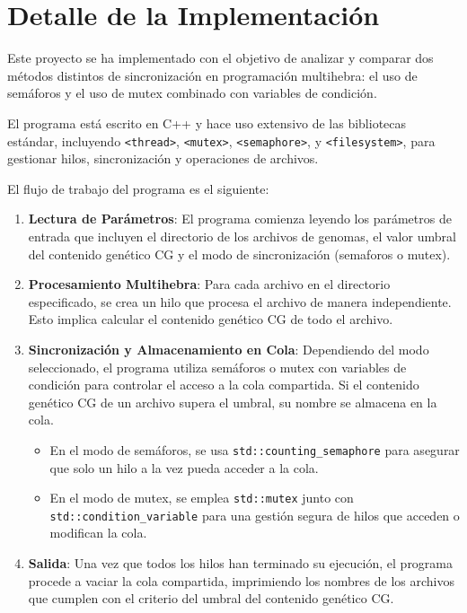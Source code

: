 \documentclass[
	spanish, %
	oneside
]{article}
\begin{document}
\templateFinalcfg


\section*{Detalle de la Implementación}

\noindent Este proyecto se ha implementado con el objetivo de analizar y comparar dos métodos distintos de sincronización en programación multihebra:
 el uso de semáforos y el uso de mutex combinado con variables de condición. 
\vspace*{12pt}

\noindent El programa está escrito en C++ y hace uso extensivo de las bibliotecas estándar, incluyendo \texttt{<thread>}, \texttt{<mutex>}, \texttt{<semaphore>}, y \texttt{<filesystem>}, para gestionar hilos, sincronización y operaciones de archivos.

\vspace*{8pt}
\noindent El flujo de trabajo del programa es el siguiente:
\begin{enumerate}
    \item \textbf{Lectura de Parámetros}: El programa comienza leyendo los parámetros de entrada que incluyen el directorio de los archivos de genomas, el valor umbral del contenido genético CG y el modo de sincronización (semaforos o mutex).
    \item \textbf{Procesamiento Multihebra}: Para cada archivo en el directorio especificado, se crea un hilo que procesa el archivo de manera independiente. Esto implica calcular el contenido genético CG de todo el archivo.
    \item \textbf{Sincronización y Almacenamiento en Cola}: Dependiendo del modo seleccionado, el programa utiliza semáforos o mutex con variables de condición para controlar el acceso a la cola compartida. Si el contenido genético CG de un archivo supera el umbral, su nombre se almacena en la cola.
    \begin{itemize}
        \item En el modo de semáforos, se usa \texttt{std::counting\_semaphore} para asegurar que solo un hilo a la vez pueda acceder a la cola.
        \item En el modo de mutex, se emplea \texttt{std::mutex} junto con \texttt{std::condition\_variable} para una gestión segura de hilos que acceden o modifican la cola.
    \end{itemize}
    \item \textbf{Salida}: Una vez que todos los hilos han terminado su ejecución, el programa procede a vaciar la cola compartida, imprimiendo los nombres de los archivos que cumplen con el criterio del umbral del contenido genético CG.
\end{enumerate}
\end{document}
